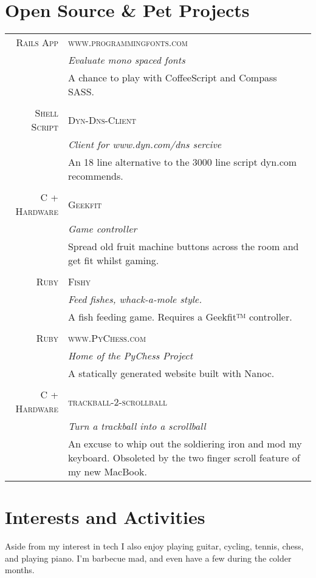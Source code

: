 \documentclass[a4paper,11pt]{article}
\begin{document}
\section{Open Source \& Pet Projects}
\begin{tabular}{r|p{11.2cm}}
  \textsc{Rails App} &\textsc{www.programmingfonts.com} \\
                     &\emph{Evaluate mono spaced fonts}\\
                     &\footnotesize{A chance to play with CoffeeScript and Compass SASS.}
  \\\multicolumn{2}{c}{} \\
  \textsc{Shell Script} &\textsc{Dyn-Dns-Client} \\
                        &\emph{Client for www.dyn.com/dns sercive}\\
                        &\footnotesize{An 18 line alternative to the 3000 line script dyn.com recommends.}
  \\\multicolumn{2}{c}{} \\
  \textsc{C + Hardware} &\textsc{Geekfit} \\
                        &\emph{Game controller}\\
                        &\footnotesize{Spread old fruit machine buttons across the room and get fit whilst gaming.}
  \\\multicolumn{2}{c}{} \\
  \textsc{Ruby}         &\textsc{Fishy} \\
                        &\emph{Feed fishes, whack-a-mole style.}\\
                        &\footnotesize{A fish feeding game. Requires a Geekfit™ controller.}
  \\\multicolumn{2}{c}{} \\
  \textsc{Ruby}         &\textsc{www.PyChess.com} \\
                        &\emph{Home of the PyChess Project}\\
                        &\footnotesize{A statically generated website built with Nanoc.}
  \\\multicolumn{2}{c}{} \\
  \textsc{C + Hardware} &\textsc{trackball-2-scrollball} \\
                        &\emph{Turn a trackball into a scrollball}\\
                        &\footnotesize{An excuse to whip out the soldiering iron and mod my keyboard.
                          Obsoleted by the two finger scroll feature of my new MacBook.} \\
\end{tabular}
\newline
\newline
\section{Interests and Activities}

Aside from my interest in tech I also enjoy playing guitar, cycling, tennis, chess, and
playing piano. I'm barbecue mad, and even have a few during the colder months. \\
\end{document}
